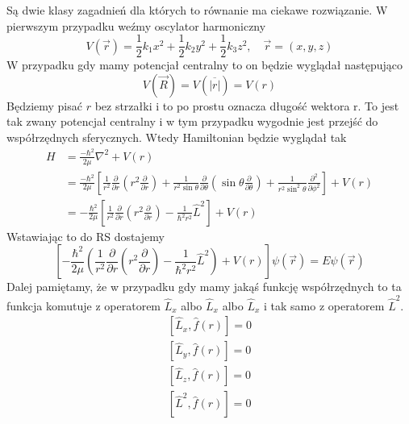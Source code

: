 Są dwie klasy zagadnień dla których to równanie ma ciekawe rozwiązanie.
W pierwszym przypadku weźmy oscylator harmoniczny
\begin{equation*}
	V(\vec{r})=\frac{1}{2} k_{1} x^{2}+\frac{1}{2} k_{2} y^{2}+\frac{1}{2} k_{3} z^{2}, \quad \vec{r} = (x, y, z)
\end{equation*}
W przypadku gdy mamy potencjał centralny to on będzie wyglądał następująco
\begin{equation*}
	V(\vec{R}) = V(\overline{|r|}) = V(r)
\end{equation*}
Będziemy pisać $r$ bez strzałki i to po prostu oznacza długość wektora r. To jest tak zwany potencjał centralny i w tym przypadku wygodnie jest przejść do współrzędnych sferycznych. Wtedy Hamiltonian będzie wyglądał tak
\begin{equation*}
	\begin{split}
			H &=\frac{-\hbar^{2}}{2 \mu} \nabla^{2}+V(r) \\
			&= \frac{-\hbar^{2}}{2 \mu} \left[ \frac{1}{r^{2}} \frac{\partial}{\partial r} \left( r^{2} \frac{\partial}{\partial r} \right) + \frac{1}{r^{2} \sin \theta} \frac{\partial}{\partial \theta} \left( \sin \theta \frac{\partial}{\partial \theta} \right) + \frac{1}{r^{2} \sin^{2} \theta} \frac{\partial^{2}}{\partial \phi^{2}} \right] +V(r) \\
			&= -\frac{\hbar^2}{2\mu} \left[ \frac{1}{r^2} \frac{\partial}{\partial r} \left( r^2 \frac{\partial}{\partial r} \right) - \frac{1}{\hbar^2 r^2} \hat{L}^2 \right] + V(r)
	\end{split}
\end{equation*}
Wstawiając to do RS dostajemy
\begin{equation*}
	\left[ -\frac{\hbar^2}{2\mu} \left( \frac{1}{r^2} \frac{\partial}{\partial r} \left( r^2 \frac{\partial}{\partial r} \right) - \frac{1}{\hbar^2 r^2} \hat{L}^2 \right) + V(r) \right] \psi(\vec{r}) = E \psi(\vec{r})
\end{equation*}
Dalej pamiętamy, że w przypadku gdy mamy jakąś funkcję współrzędnych to ta funkcja komutuje z operatorem $\hat{L}_x$ albo $\hat{L}_x$ albo $\hat{L}_x$ i tak samo z operatorem $\hat{L}^2$. 
\begin{equation*}
	\begin{split}
		[\hat{L}_x, \hat{f}(r)] = 0 \\
		[\hat{L}_y, \hat{f}(r)] = 0 \\
		[\hat{L}_z, \hat{f}(r)] = 0 \\
		[\hat{L}^2, \hat{f}(r)] = 0 
	\end{split}
\end{equation*}
